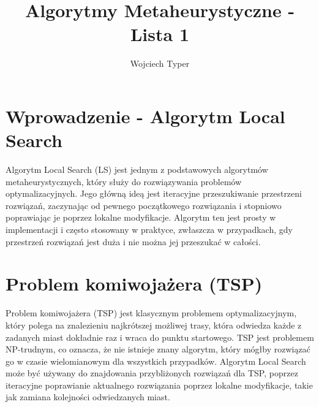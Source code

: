 \documentclass{article}
\title{Algorytmy Metaheurystyczne - Lista 1}
\author{Wojciech Typer}
\date{}
\begin{document}
\maketitle

\section*{Wprowadzenie - Algorytm Local Search}
Algorytm Local Search (LS) jest jednym z podstawowych algorytmów metaheurystycznych, który służy do rozwiązywania problemów optymalizacyjnych. 
Jego główną ideą jest iteracyjne przeszukiwanie przestrzeni rozwiązań, zaczynając od pewnego początkowego rozwiązania i stopniowo poprawiając 
je poprzez lokalne modyfikacje. Algorytm ten jest prosty w implementacji i często stosowany w praktyce, zwłaszcza w przypadkach, 
gdy przestrzeń rozwiązań jest duża i nie można jej przeszukać w całości.

\section*{Problem komiwojażera (TSP)}
Problem komiwojażera (TSP) jest klasycznym problemem optymalizacyjnym, który polega na znalezieniu najkrótszej możliwej trasy, 
która odwiedza każde z zadanych miast dokładnie raz i wraca do punktu startowego. TSP jest problemem NP-trudnym, co oznacza, 
że nie istnieje znany algorytm, który mógłby rozwiązać go w czasie wielomianowym dla wszystkich przypadków. 
Algorytm Local Search może być używany do znajdowania przybliżonych rozwiązań dla TSP, poprzez iteracyjne poprawianie aktualnego rozwiązania 
poprzez lokalne modyfikacje, takie jak zamiana kolejności odwiedzanych miast.

\newpage
\end{document}
